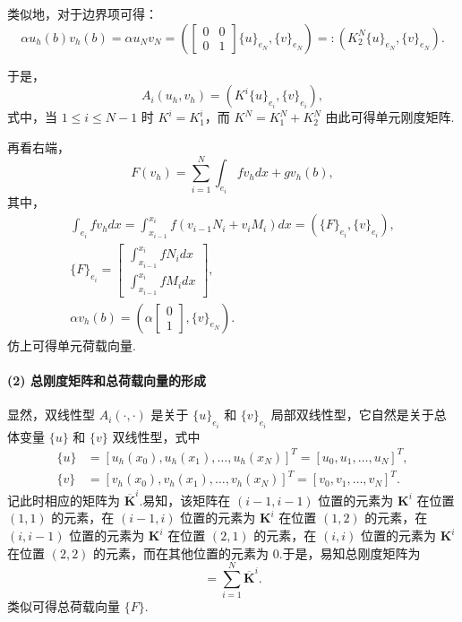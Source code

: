 类似地，对于边界项可得：
\begin{equation*}
\alpha u_h(b)v_h(b) = \alpha u_N v_N = \left( \begin{bmatrix} 0 & 0 \\ 0 & 1 \end{bmatrix} \{u\}_{e_N}, \{v\}_{e_N} \right) =: (K_2^N \{u\}_{e_N}, \{v\}_{e_N}).
\end{equation*}

于是，
\begin{equation*}
    A_i(u_h, v_h) = (K^i \{u\}_{e_i}, \{v\}_{e_i}),
\end{equation*}
式中，当 $1 \leq i \leq N-1$ 时 $K^i = K_1^i$，而 $K^N = K_1^N + K_2^N$ 由此可得单元刚度矩阵.

再看右端，
\begin{equation}\label{eq:load_vector}
F(v_h) = \sum_{i=1}^N \int_{e_i} f v_h dx + g v_h(b),
\end{equation}
其中，
\begin{gather*}
\int_{e_i} f v_h dx = \int_{x_{i-1}}^{x_i} f (v_{i-1}N_i + v_i M_i) dx = (\{F\}_{e_i}, \{v\}_{e_i}), \\
\{F\}_{e_i} = \begin{bmatrix} \int_{x_{i-1}}^{x_i} f N_i dx \\ \int_{x_{i-1}}^{x_i} f M_i dx \end{bmatrix}, \\
\alpha v_h(b) = \left( \alpha \begin{bmatrix} 0 \\ 1 \end{bmatrix}, \{v\}_{e_N} \right).
\end{gather*}
仿上可得单元荷载向量.

\paragraph{(2) 总刚度矩阵和总荷载向量的形成}
显然，双线性型 $A_i(\cdot, \cdot)$ 是关于 $\{u\}_{e_i}$ 和 $\{v\}_{e_i}$ 局部双线性型，它自然是关于总体变量 $\{u\}$ 和 $\{v\}$ 双线性型，式中
\begin{align*}
\{u\} &= [u_h(x_0), u_h(x_1), \dots, u_h(x_N)]^T = [u_0, u_1, \dots, u_N]^T, \\
\{v\} &= [v_h(x_0), v_h(x_1), \dots, v_h(x_N)]^T = [v_0, v_1, \dots, v_N]^T.
\end{align*}
记此时相应的矩阵为 $\overline{\bm{K}}^i$.易知，该矩阵在 $(i-1, i-1)$ 位置的元素为 $\bm{K}^i$ 在位置 $(1,1)$ 的元素，在 $(i-1, i)$ 位置的元素为 $\bm{K}^i$ 在位置 $(1,2)$ 的元素，在 $(i, i-1)$ 位置的元素为 $\bm{K}^i$ 在位置 $(2,1)$ 的元素，在 $(i,i)$ 位置的元素为 $\bm{K}^i$ 在位置 $(2,2)$ 的元素，而在其他位置的元素为 0.于是，易知总刚度矩阵为
\begin{equation}
[K] = \sum_{i=1}^N \overline{\bm{K}}^i.
\end{equation}
类似可得总荷载向量 $\{F\}$.

